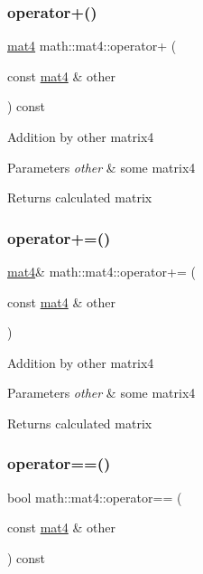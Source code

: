 \subsubsection{\texorpdfstring{operator+()}{operator+()}}
{\footnotesize\ttfamily \hyperlink{structmath_1_1mat4}{mat4} math\+::mat4\+::operator+ (\begin{DoxyParamCaption}\item[{const \hyperlink{structmath_1_1mat4}{mat4} \&}]{other }\end{DoxyParamCaption}) const\hspace{0.3cm}{\ttfamily [inline]}}

Addition by other matrix4 
\begin{DoxyParams}{Parameters}
{\em other} & some matrix4 \\
\hline
\end{DoxyParams}
\begin{DoxyReturn}{Returns}
calculated matrix 
\end{DoxyReturn}
\mbox{\label{structmath_1_1mat4_a468b63b10d99f5cff5ab0463a9824eec}} 
\subsubsection{\texorpdfstring{operator+=()}{operator+=()}}
{\footnotesize\ttfamily \hyperlink{structmath_1_1mat4}{mat4}\& math\+::mat4\+::operator+= (\begin{DoxyParamCaption}\item[{const \hyperlink{structmath_1_1mat4}{mat4} \&}]{other }\end{DoxyParamCaption})\hspace{0.3cm}{\ttfamily [inline]}}

Addition by other matrix4 
\begin{DoxyParams}{Parameters}
{\em other} & some matrix4 \\
\hline
\end{DoxyParams}
\begin{DoxyReturn}{Returns}
calculated matrix 
\end{DoxyReturn}
\mbox{\label{structmath_1_1mat4_a9093d3f340dc10c2f36e6a11eb2de64f}} 
\subsubsection{\texorpdfstring{operator==()}{operator==()}}
{\footnotesize\ttfamily bool math\+::mat4\+::operator== (\begin{DoxyParamCaption}\item[{const \hyperlink{structmath_1_1mat4}{mat4} \&}]{other }\end{DoxyParamCaption}) const\hspace{0.3cm}{\ttfamily [inline]}}

